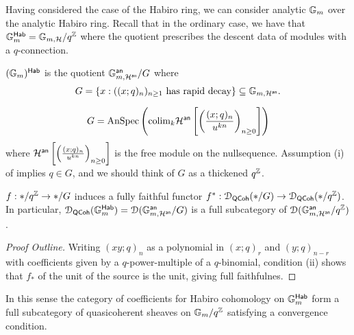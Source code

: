 Having considered the case of the Habiro ring, we can consider analytic $\mathbb{G}_{m}$ over the analytic Habiro ring. Recall that in the ordinary case, we have that $\mathbb{G}_{m}^{\mathsf{Hab}}=\mathbb{G}_{m,\mathcal{H}}/q^{\mathbb{Z}}$ where the quotient prescribes the descent data of modules with a $q$-connection. 
\begin{definition}\label{def: analytic Gm on Habiro ring}
    $(\mathbb{G}_{m})^{\mathsf{Hab}}$ is the quotient $\mathbb{G}^{\mathsf{an}}_{m,\mathcal{H}^{\mathsf{an}}}/G$ where 
    $$G=\left\{x:((x;q)_{n})_{n\geq1}\text{ has rapid decay}\right\}\subseteq\mathbb{G}_{m,\mathcal{H}^{\mathsf{an}}}.$$
\end{definition}
\begin{remark}
    $$G=\mathrm{AnSpec}\left(\mathrm{colim}_{k}\mathcal{H}^{\mathsf{an}}\left[\left(\frac{(x;q)_{n}}{u^{kn}}\right)_{n\geq0}\right]\right)$$
    where $\mathcal{H}^{\mathsf{an}}\left[\left(\frac{(x;q)_{n}}{u^{kn}}\right)_{n\geq0}\right]$ is the free module on the nullsequence. Assumption (i) of  implies $q\in G$, and we should think of $G$ as a thickened $q^{\mathbb{Z}}$. 
\end{remark}
\begin{lemma}
    $f:*/q^{\mathbb{Z}}\to */G$ induces a fully faithful functor $f^{*}:\EuScript{D}_{\mathsf{QCoh}}(*/G)\to\EuScript{D}_{\mathsf{QCoh}}(*/q^{\mathbb{Z}})$. In particular, $\EuScript{D}_{\mathsf{QCoh}}(\mathbb{G}_{m}^{\mathsf{Hab}})=\EuScript{D}(\mathbb{G}_{m,\mathcal{H}^{\mathsf{an}}}^{\mathsf{an}}/G)$ is a full subcategory of $\EuScript{D}(\mathbb{G}_{m,\mathcal{H}^{\mathsf{an}}}^{\mathsf{an}}/q^{\mathbb{Z}})$. 
\end{lemma}
\begin{proof}[Proof Outline]
   Writing $(xy;q)_{n}$ as a polynomial in $(x;q)_{r}$ and $(y;q)_{n-r}$ with coefficients given by a $q$-power-multiple of a $q$-binomial, condition (ii) shows that $f_{*}$ of the unit of the source is the unit, giving full faithfulnes. 
\end{proof}
In this sense the category of coefficients for Habiro cohomology on $\mathbb{G}_{m}^{\mathsf{Hab}}$ form a full subcategory of quasicoherent sheaves on $\mathbb{G}_{m}/q^{\mathbb{Z}}$ satisfying a convergence condition. 

